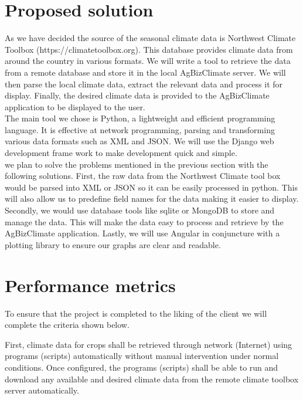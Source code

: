 \documentclass[letterpaper,10pt]{article}
\begin{document}
	  \section*{Proposed solution}
   As we have decided the source of the seasonal climate data is Northwest Climate Toolbox (https://climatetoolbox.org). This database provides climate data from around the country in various formats. We will write a tool to retrieve the data from a remote database and store it in the local AgBizClimate server. We will then  parse the local climate data, extract the relevant data and process it for display. Finally, the desired climate data is provided to the AgBizClimate application to be displayed to the user.\\
   
   The main tool we chose is Python, a lightweight and efficient programming language. It is effective at network programming, parsing and transforming various data formats such as XML and JSON. We will use the Django web development frame work to make development quick and simple.\\
   
	we plan to solve the problems mentioned in the previous section with the following solutions. First, the raw data from the Northwest Climate tool box would be parsed into XML or JSON so it can be easily processed in python. This will also allow us to predefine field names for the data making it easier to display. Secondly, we would use database tools like sqlite or MongoDB to store and manage the data. This will make the data easy to process and retrieve by the AgBizClimate application. Lastly, we will use Angular in conjuncture with a plotting library to ensure our graphs are clear and readable.\\
	
	  \section*{Performance metrics}
		To ensure that the project is completed to the liking of the client we will complete the criteria shown below.
    
    First, climate data for crops shall be retrieved through network (Internet) using programs (scripts) automatically without manual intervention under normal conditions. Once configured, the programs (scripts) shall be able to run and download any available and desired climate data from the remote climate toolbox server automatically.\\
    
\end{document}
